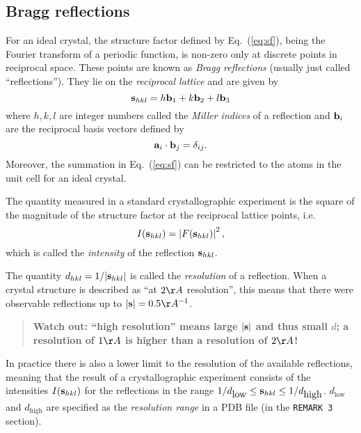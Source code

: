 \documentclass[12pt]{article}
\newcommand{\vect}[1]{{\bf #1}}
\newcommand{\va}{\vect{a}}
\newcommand{\vb}{\vect{b}}
\newcommand{\vs}{\vect{s}}
\begin{document}
\begin{sloppy}
\subsection{Bragg reflections}

For an ideal crystal, the structure factor defined by
Eq.~(\ref{eq:sf}), being the Fourier transform of a periodic function,
is non-zero only at discrete points in reciprocal space. These points
are known as \textit{Bragg reflections} (usually just called
``reflections''). They lie on the \textit{reciprocal lattice} and are
given by
\begin{equation}
\vs_{hkl} = h \vb_1 + k \vb_2 + l \vb_3
\end{equation}
where $h, k, l$ are integer numbers called the \textit{Miller indices}
of a reflection and $\vb_i$ are the reciprocal basis vectors defined by
\begin{equation}
\va_i \cdot \vb_j = \delta_{ij}.
\end{equation}
Moreover, the summation in Eq.~(\ref{eq:sf}) can be restricted to the
atoms in the unit cell for an ideal crystal.

The quantity measured in a standard crystallographic experiment is the
square of the magnitude of the structure factor at the reciprocal
lattice points, i.e.
\begin{equation}
I(\vs_{hkl}) = \left| F(\vs_{hkl}) \right|^2,
\end{equation}
which is called the \textit{intensity} of the reflection $\vs_{hkl}$.

The quantity $d_{hkl}=1/|\vs_{hkl}|$ is called the \textit{resolution}
of a reflection. When a crystal structure is described as ``at $2 \AA$
resolution'', this means that there were observable reflections up to
$|\vs|=0.5 \AA^{-1}$.
\begin{quote}
\textbf{Watch out: ``high resolution'' means large $|\vs|$ and thus small $d$;
a resolution of $1 \AA$ is higher than a resolution of $2 \AA$!}
\end{quote}

In practice there is also a lower limit to the resolution of the
available reflections, meaning that the result of a crystallographic
experiment consists of the intensities $I(\vs_{hkl})$ for the
reflections in the range $1/d_{\mbox{low}} \leq \vs_{hkl} \leq
1/d_{\mbox{high}}$. $d_{\mbox{low}}$ and $d_{\mbox{high}}$ are
specified as the \textit{resolution range} in a PDB file (in the
\texttt{REMARK   3} section).


\end{sloppy}
\end{document}

